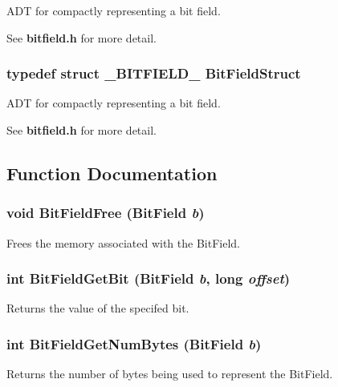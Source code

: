 ADT for compactly representing a bit field. 

See {\bf bitfield.h} for more detail. 
\subsubsection{\setlength{\rightskip}{0pt plus 5cm}typedef struct {\bf \_\-BITFIELD\_\-}  {\bf Bit\-Field\-Struct}}\label{bitfield_8h_a0}


ADT for compactly representing a bit field. 

See {\bf bitfield.h} for more detail. 

\subsection{Function Documentation}
\subsubsection{\setlength{\rightskip}{0pt plus 5cm}void Bit\-Field\-Free (Bit\-Field {\em b})}\label{bitfield_8h_a5}


Frees the memory associated with the Bit\-Field. 

\subsubsection{\setlength{\rightskip}{0pt plus 5cm}int Bit\-Field\-Get\-Bit (Bit\-Field {\em b}, long {\em offset})}\label{bitfield_8h_a8}


Returns the value of the specifed bit. 

\subsubsection{\setlength{\rightskip}{0pt plus 5cm}int Bit\-Field\-Get\-Num\-Bytes (Bit\-Field {\em b})}\label{bitfield_8h_a7}


Returns the number of bytes being used to represent the Bit\-Field. 

